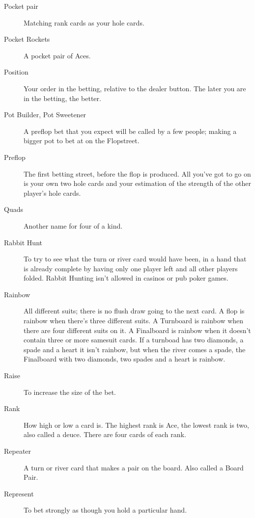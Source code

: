 \begin{description}
\item[Pocket pair] Matching rank cards as your hole cards.

\item[Pocket Rockets] A pocket pair of Aces.

\item[Position] Your order in the betting, relative to the dealer
button. The later you are in the betting, the better.

\item[Pot Builder, Pot Sweetener] A preflop bet that you expect will
be called by a few people; making a bigger pot to bet at on the
Flopstreet.

\item[Preflop] The first betting street, before the flop is produced.
All you've got to go on is your own two hole cards and your estimation
of the strength of the other player's hole cards.

\item[Quads] Another name for four of a kind.

\item[Rabbit Hunt] To try to see what the turn or river card would
have been, in a hand that is already complete by having only one
player left and all other players folded. Rabbit Hunting isn't allowed
in casinos or pub poker games.

\item[Rainbow] All different suits; there is no flush
draw going to the next card. A flop is rainbow when there's three
different suits. A Turnboard is rainbow when there are four different
suits on it. A Finalboard is rainbow when it doesn't contain
three or more samesuit cards. If a turnboad has two diamonds, a
spade and a heart it isn't rainbow, but when the river comes a spade,
the Finalboard with two diamonds, two spades and a heart is rainbow.

\item[Raise] To increase the size of the bet.

\item[Rank] How high or low a card is. The highest rank is Ace, the
lowest rank is two, also called a deuce. There are four cards of
each rank.

\item[Repeater] A turn or river card that makes a pair on the
board. Also called a Board Pair.

\item[Represent] To bet strongly as though you hold a particular hand.


\end{description}
